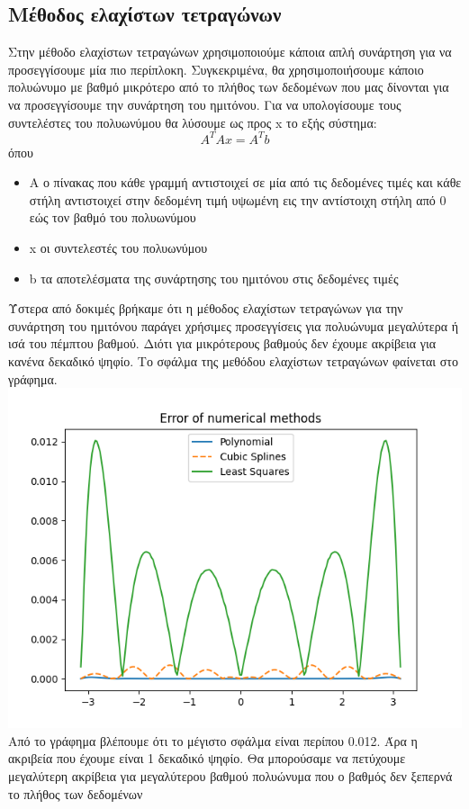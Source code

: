 \documentclass[a4paper,11pt]{article}
\newcommand{\gt}{\greektext}
\newcommand{\lt}{\latintext}
\begin{document}
\newpage
\subsection{Μέθοδος ελαχίστων τετραγώνων}
Στην μέθοδο ελαχίστων τετραγώνων χρησιμοποιούμε κάποια απλή συνάρτηση για να προσεγγίσουμε μία πιο περίπλοκη. Συγκεκριμένα, θα χρησιμοποιήσουμε κάποιο πολυώνυμο με βαθμό μικρότερο από το πλήθος των δεδομένων που μας δίνονται για να προσεγγίσουμε την συνάρτηση του ημιτόνου. Για να υπολογίσουμε τους συντελέστες του πολυωνύμου θα  λύσουμε ως προς \lt x \gt το εξής σύστημα:
\begin{equation*}
A^TAx = A^Tb
\end{equation*}
όπου 
\begin{itemize}
\item Α ο πίνακας που κάθε γραμμή αντιστοιχεί σε μία από τις δεδομένες τιμές και κάθε στήλη αντιστοιχεί στην δεδομένη τιμή υψωμένη εις την αντίστοιχη στήλη από 0 εώς τον βαθμό του πολυωνύμου
\item \lt x \gt οι συντελεστές του πολυωνύμου
\item \lt b \gt τα αποτελέσματα της συνάρτησης του ημιτόνου στις δεδομένες τιμές
\end{itemize}
Ύστερα από δοκιμές βρήκαμε ότι η μέθοδος ελαχίστων τετραγώνων για την συνάρτηση του ημιτόνου παράγει χρήσιμες προσεγγίσεις για πολυώνυμα μεγαλύτερα ή ισά του πέμπτου βαθμού.
Διότι για μικρότερους βαθμούς δεν έχουμε ακρίβεια για κανένα δεκαδικό ψηφίο.
Το σφάλμα της μεθόδου ελαχίστων τετραγώνων φαίνεται στο γράφημα. \\
\hspace*{-2 cm}
\includegraphics[scale=1]{ls.png}
Από το γράφημα βλέπουμε ότι το μέγιστο σφάλμα είναι περίπου 0.012.  Άρα η ακριβεία που έχουμε είναι 1 δεκαδικό ψηφίο. Θα μπορούσαμε να πετύχουμε μεγαλύτερη ακρίβεια για μεγαλύτερου βαθμού πολυώνυμα που ο βαθμός δεν ξεπερνά το πλήθος των δεδομένων
\end{document}
